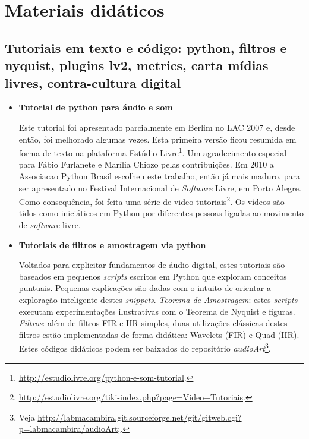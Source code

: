 \begin{itemize}
\end{itemize}



\section{Materiais didáticos}

  \subsection{ Tutoriais em texto e código: python, filtros e nyquist, plugins lv2, metrics, carta mídias livres, contra-cultura digital }\label{subsec:tuts}

\begin{itemize}
    \item {\bf Tutorial de python para áudio e som}

Este tutorial foi apresentado parcialmente em Berlim no LAC 2007 e, desde então, foi melhorado algumas vezes. Esta
primeira versão ficou resumida em forma de texto na plataforma
Estúdio Livre\footnote{\url{http://estudiolivre.org/python-e-som-tutorial}.}.
Um agradecimento especial para Fábio Furlanete e Marília Chiozo pelas contribuições.
Em 2010
a Associacao Python Brasil escolheu este trabalho, então já mais maduro, para ser apresentado no
Festival Internacional de \emph{Software} Livre, em Porto Alegre. Como consequência, 
foi feita uma série de video-tutoriais\footnote{\url{http://estudiolivre.org/tiki-index.php?page=Video+Tutoriais}.}.
Os vídeos são tidos como iniciáticos em Python por diferentes pessoas ligadas ao movimento de \emph{software} livre.

    \item {\bf Tutoriais de filtros e amostragem via python }

Voltados para explicitar fundamentos de áudio digital, estes tutoriais
são baseados em pequenos \emph{scripts} escritos em Python que exploram conceitos puntuais. Pequenas explicações são
dadas com o intuito de orientar a exploração inteligente destes \emph{snippets}.
\emph{Teorema de Amostragem}: estes \emph{scripts} executam experimentações ilustrativas com
o Teorema de Nyquist e figuras.
\emph{Filtros}: além de filtros FIR e IIR simples,
duas utilizações clássicas destes filtros estão implementadas
de forma didática: Wavelets (FIR) e Quad (IIR).
Estes códigos didáticos podem ser baixados do repositório \emph{audioArt}\footnote{Veja \url{http://labmacambira.git.sourceforge.net/git/gitweb.cgi?p=labmacambira/audioArt;}.}.


\end{itemize}

